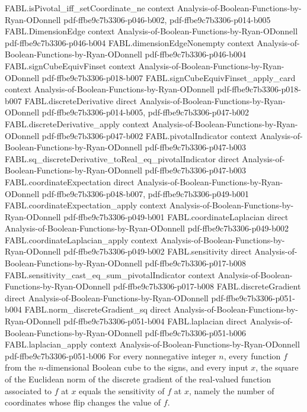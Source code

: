 \begin{theorem}
\proofstep
  {FABL.isPivotal_iff_setCoordinate_ne}
  {context}
  {Analysis-of-Boolean-Functions-by-Ryan-ODonnell}
  {pdf-ffbe9c7b3306-p046-b002,
    pdf-ffbe9c7b3306-p014-b005}
\proofstep
  {FABL.DimensionEdge}
  {context}
  {Analysis-of-Boolean-Functions-by-Ryan-ODonnell}
  {pdf-ffbe9c7b3306-p046-b004}
\proofstep
  {FABL.dimensionEdgeNonempty}
  {context}
  {Analysis-of-Boolean-Functions-by-Ryan-ODonnell}
  {pdf-ffbe9c7b3306-p046-b004}
\proofstep
  {FABL.signCubeEquivFinset}
  {context}
  {Analysis-of-Boolean-Functions-by-Ryan-ODonnell}
  {pdf-ffbe9c7b3306-p018-b007}
\proofstep
  {FABL.signCubeEquivFinset_apply_card}
  {context}
  {Analysis-of-Boolean-Functions-by-Ryan-ODonnell}
  {pdf-ffbe9c7b3306-p018-b007}
\proofstep
  {FABL.discreteDerivative}
  {direct}
  {Analysis-of-Boolean-Functions-by-Ryan-ODonnell}
  {pdf-ffbe9c7b3306-p014-b005,
    pdf-ffbe9c7b3306-p047-b002}
\proofstep
  {FABL.discreteDerivative_apply}
  {context}
  {Analysis-of-Boolean-Functions-by-Ryan-ODonnell}
  {pdf-ffbe9c7b3306-p047-b002}
\proofstep
  {FABL.pivotalIndicator}
  {context}
  {Analysis-of-Boolean-Functions-by-Ryan-ODonnell}
  {pdf-ffbe9c7b3306-p047-b003}
\proofstep
  {FABL.sq_discreteDerivative_toReal_eq_pivotalIndicator}
  {direct}
  {Analysis-of-Boolean-Functions-by-Ryan-ODonnell}
  {pdf-ffbe9c7b3306-p047-b003}
\proofstep
  {FABL.coordinateExpectation}
  {direct}
  {Analysis-of-Boolean-Functions-by-Ryan-ODonnell}
  {pdf-ffbe9c7b3306-p048-b007,
    pdf-ffbe9c7b3306-p049-b001}
\proofstep
  {FABL.coordinateExpectation_apply}
  {context}
  {Analysis-of-Boolean-Functions-by-Ryan-ODonnell}
  {pdf-ffbe9c7b3306-p049-b001}
\proofstep
  {FABL.coordinateLaplacian}
  {direct}
  {Analysis-of-Boolean-Functions-by-Ryan-ODonnell}
  {pdf-ffbe9c7b3306-p049-b002}
\proofstep
  {FABL.coordinateLaplacian_apply}
  {context}
  {Analysis-of-Boolean-Functions-by-Ryan-ODonnell}
  {pdf-ffbe9c7b3306-p049-b002}
\proofstep
  {FABL.sensitivity}
  {direct}
  {Analysis-of-Boolean-Functions-by-Ryan-ODonnell}
  {pdf-ffbe9c7b3306-p017-b008}
\proofstep
  {FABL.sensitivity_cast_eq_sum_pivotalIndicator}
  {context}
  {Analysis-of-Boolean-Functions-by-Ryan-ODonnell}
  {pdf-ffbe9c7b3306-p017-b008}
\proofstep
  {FABL.discreteGradient}
  {direct}
  {Analysis-of-Boolean-Functions-by-Ryan-ODonnell}
  {pdf-ffbe9c7b3306-p051-b004}
\proofstep
  {FABL.norm_discreteGradient_sq}
  {direct}
  {Analysis-of-Boolean-Functions-by-Ryan-ODonnell}
  {pdf-ffbe9c7b3306-p051-b004}
\proofstep
  {FABL.laplacian}
  {direct}
  {Analysis-of-Boolean-Functions-by-Ryan-ODonnell}
  {pdf-ffbe9c7b3306-p051-b006}
\proofstep
  {FABL.laplacian_apply}
  {context}
  {Analysis-of-Boolean-Functions-by-Ryan-ODonnell}
  {pdf-ffbe9c7b3306-p051-b006}
For every nonnegative integer $n$, every function $f$ from the $n$-dimensional Boolean
cube to the signs, and every input $x$, the square of the Euclidean norm of the discrete
gradient of the real-valued function associated to $f$ at $x$ equals the sensitivity of
$f$ at $x$, namely the number of coordinates whose flip changes the value of $f$.
\end{theorem}

